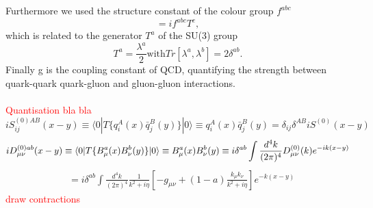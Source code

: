 	Furthermore we used the structure constant of the colour group $f^{abc}$
	\begin{equation}
		[T^a, T^b] = if^{abc}T^c, 
	\end{equation}
	which is related to the generator $T^a$ of the SU(3) group
	\begin{equation}
		T^a = \frac{\lambda^a}{2} \text{with} Tr[\lambda^a, \lambda^b] = 2\delta^{ab}.
	\end{equation}
	Finally g is the coupling constant of QCD, quantifying the strength between quark-quark quark-gluon and gluon-gluon interactions. 
	\\\\
	\textcolor{red}{Quantisation bla bla}
	\begin{equation}
		\label{eq:quarkPropagator}
		iS^{(0)AB}_{ij}(x-y) \equiv \langle0|T\{q_i^A(x)\bar q_j^B(y)\}|0\rangle \equiv q_i^A(x)\bar q_j^B(y) = \delta_{ij}\delta^{AB}iS^{(0)}(x-y) 
	\end{equation}
	\begin{equation}	
		iD^{(0)ab}_{\mu\nu}(x-y) \equiv \langle0|T\{B_\mu^a(x)B_\nu^b(y)\}|0\rangle \equiv B_\mu^a(x)B_\nu^b(y) \equiv i\delta^{ab}\int\frac{d^4k}{(2\pi)^4}D^{(0)}_{\mu\nu}(k)e^{-ik(x-y)} \\
	\end{equation}
	\begin{align}
		&= i\delta^{ab}\int\frac{d^4k}{(2\pi)^4}\frac{1}{k^2+i\eta}\left[-g_{\mu\nu}+(1-a)\frac{k_\mu k_\nu}{k^2+i\eta}\right]e^{-k(x-y)}
	\end{align}
	\textcolor{red}{draw contractions}
	



